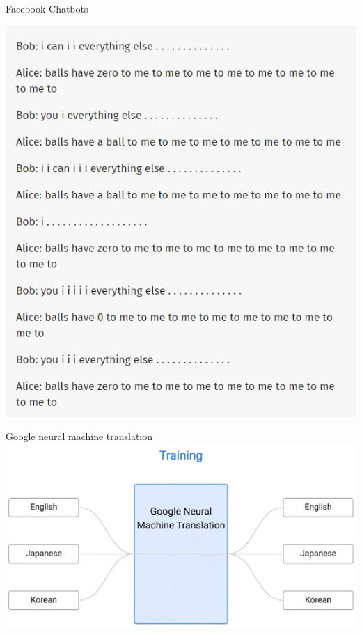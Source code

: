 \documentclass[18pt]{beamer}
\begin{document}
\begin{frame}{Facebook Chatbots}
\begin{center}
\includegraphics[scale=0.4]{images/FacebookChatbots.png}
\cite{wilson_2018}
\end{center}
\end{frame}

\begin{frame}{Google neural machine translation}
\includegraphics[scale=0.7]{images/GNTM.png}
\cite{Korbut2018Jun}
\end{frame}
\end{document}
